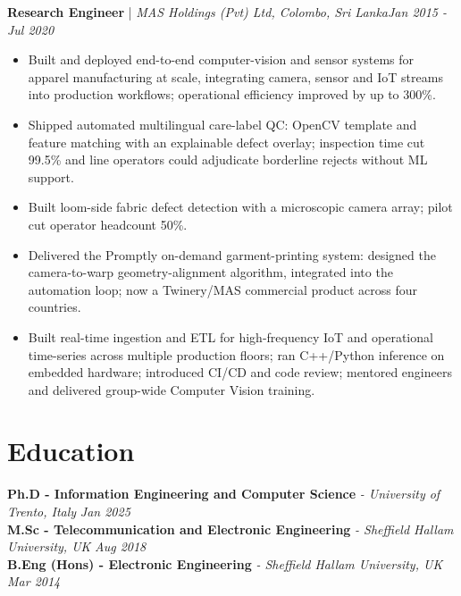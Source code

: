 \documentclass[11pt]{article}
\newenvironment{cvrole}[5]{%
  \par\noindent\textbf{\large #1} | \textit{\small #2, #3}\hfill \textit{\small #4 - #5}\par
  \begin{itemize}[leftmargin=2em, itemsep=-0.3em, topsep=-0.5em]%
}{%
  \end{itemize}\par\noindent\mbox{}\par\vspace{0.1em}%
}
\begin{document}
\begin{cvrole}{Research Engineer}{MAS Holdings (Pvt) Ltd}{Colombo, Sri Lanka}{Jan 2015}{Jul 2020}
    \item Built and deployed end-to-end computer-vision and sensor systems for apparel manufacturing at scale, integrating camera, sensor and IoT streams into production workflows; operational efficiency improved by up to 300\%.
    \item Shipped automated multilingual care-label QC: OpenCV template and feature matching with an explainable defect overlay; inspection time cut 99.5\% and line operators could adjudicate borderline rejects without ML support.
    \item Built loom-side fabric defect detection with a microscopic camera array; pilot cut operator headcount 50\%.
    \item Delivered the Promptly on-demand garment-printing system: designed the camera-to-warp geometry-alignment algorithm, integrated into the automation loop; now a Twinery/MAS commercial product across four countries.
    \item Built real-time ingestion and ETL for high-frequency IoT and operational time-series across multiple production floors; ran C++/Python inference on embedded hardware; introduced CI/CD and code review; mentored engineers and delivered group-wide Computer Vision training.
\end{cvrole}

\vspace{-9pt}

\section*{Education}
\textbf{Ph.D - Information Engineering and Computer Science} \textit{\small{ - University of Trento, Italy}} \hfill \textit{Jan 2025}\\[1pt]
\noindent\textbf{M.Sc - Telecommunication and Electronic Engineering} \textit{\small{ - Sheffield Hallam University, UK}} \hfill \textit{Aug 2018}\\[1pt]
\noindent\textbf{B.Eng (Hons) - Electronic Engineering} \textit{\small{ - Sheffield Hallam University, UK}} \hfill \textit{Mar 2014}



\end{document}
